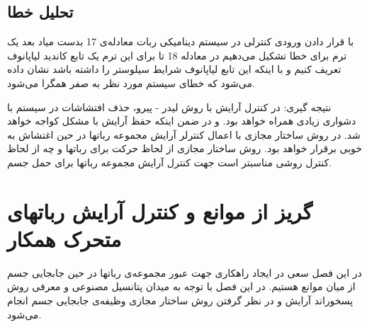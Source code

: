 \subsection{تحلیل خطا}
با قرار دادن ورودی کنترلی در سیستم دینامیکی ربات معادله‌ی 17 بدست میاد بعد یک ترم برای خطا تشکیل می‌دهیم در معادله 18 تا برای این ترم یک تابع کاندید لیاپانوف تعریف کنیم و با اینکه این تابع لیاپانوف شرایط سیلوستر را داشته باشد نشان داده می‌شود که خطای سیستم مورد نظر به صفر همگرا می‌شود.

نتیجه گیری:
در کنترل آرایش با روش لیدر - پیرو، حذف افتشاشات در سیستم با دشواری زیادی همراه خواهد بود. و در ضمن اینکه حفظ آرایش با مشکل کواجه خواهد شد. در روش ساختار مجازی با اعمال کنترلر آرایش مجموعه رباتها در حین اغتشاش به خوبی برقرار خواهد بود. روش ساختار مجازی از لحاظ حرکت برای رباتها و چه از لحاظ کنترل روشی مناسبتر است جهت کنترل آرایش مجموعه رباتها برای حمل جسم.
\section{گریز از موانع و کنترل آرایش رباتهای متحرک همکار}
در این فصل سعی در ایجاد راهکاری جهت عبور مجموعه‌ی رباتها در حین جابجایی جسم از میان موانع هستیم.
در این فصل با توجه به میدان پتانسیل مصنوعی و معرفی روش پسخوراند آرایش و در نظر گرفتن روش ساختار مجازی وظیفه‌ی جابجایی جسم انجام می‌شود.

